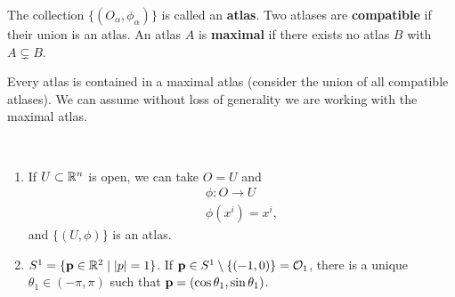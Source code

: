 \begin{definition}
    The collection $\{\left( O_\alpha, \phi_\alpha \right) \} $ is called an \textbf{atlas}. Two atlases are \textbf{compatible} if their union is an atlas. An atlas $A$ is \textbf{maximal} if there exists no atlas $B$ with $A \subsetneq B$. 
\end{definition}

Every atlas is contained in a maximal atlas (consider the union of all compatible atlases). We can assume without loss of generality we are working with the maximal atlas.

\begin{examples}~
    \begin{enumerate}[label=\roman*)]
        \item If $U \subset \mathbb{R}^{n}$ is open, we can take $O = U$ and
            \begin{align}
                \phi : O \to U \\
                \phi \left( x^{i} \right) = x^{i}
            ,\end{align}
            and $\{\left( U,\phi \right) \} $ is an atlas.
        \item $S^{1} = \{ \vb{p} \in \mathbb{R}^{2}  \mid  \left| p \right| = 1\} $.
            If $\vb{p} \in S^{1} \setminus \{ \left( -1,0 \right) \} = \mathcal{O}_1$, there is a unique $\theta_1 \in \left( -\pi, \pi \right) $ such that $\vb{p} = \left( \cos \theta_1, \sin \theta_1 \right) $.


\end{enumerate}
\end{examples}
